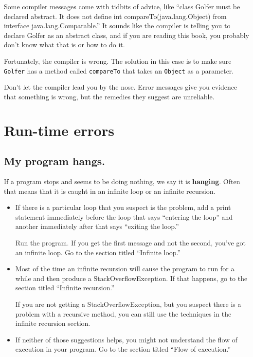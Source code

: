 \documentclass[12pt]{book}
\theoremstyle{definition}
\begin{document}
Some compiler messages come with tidbits of advice, like
``class Golfer must be declared
abstract. It does not define int compareTo(java.lang.Object) from
interface java.lang.Comparable.''  It sounds like the compiler
is telling you to declare Golfer as an abstract class, and if
you are reading this book, you probably don't know what that is
or how to do it.

Fortunately, the compiler is wrong.  The solution in this case
is to make sure {\tt Golfer} has a method called {\tt compareTo}
that takes an {\tt Object} as a parameter.

Don't let the compiler lead you by the nose.  Error
messages give you evidence that something is wrong, but 
the remedies they suggest are unreliable.


\section{Run-time errors}

\subsection*{My program hangs.}

If a program stops and seems to be doing nothing, we
say it is {\bf hanging}.  Often that means that it is caught in
an infinite loop or an infinite recursion.

\begin{itemize}

\item If there is a particular loop that you suspect is the
problem, add a print statement immediately before the loop
that says
``entering the loop'' and another immediately after that
says ``exiting the loop.''

Run the program.  If you get the first message and not
the second, you've got an infinite loop.  Go to the section
titled ``Infinite loop.''

\item Most of the time an infinite recursion will cause the program
to run for a while and then produce a StackOverflowException.
If that happens, go to the section titled ``Infinite recursion.''

If you are not getting a StackOverflowException, but you suspect
there is a problem with a recursive method, you can still use
the techniques in the infinite recursion section.

\item If neither of those suggestions helps, you might not
understand the flow of execution in your program.
Go to the section titled ``Flow of execution.''

\end{itemize}
\end{document}
